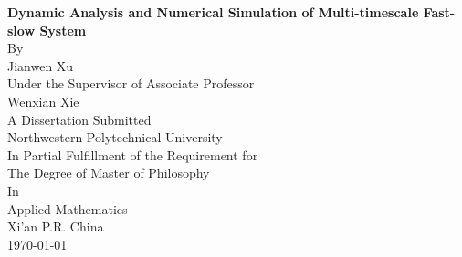 \begin{center}
{\sanhao\bf
Dynamic Analysis and Numerical Simulation of Multi-timescale Fast-slow System}\\
\vspace{2.6cm}
 {\xiaosan By\\
 Jianwen Xu\\\vspace{0.8em}
 Under the Supervisor of Associate Professor\\
 Wenxian Xie\\}
\vspace{2.6cm}
{\xiaosan
     A Dissertation Submitted \\
     Northwestern Polytechnical University\\
     \vspace{1cm}
     In Partial Fulfillment of the Requirement for\\
     The Degree of  Master of Philosophy\\
    In\\
    Applied Mathematics\\
    \vspace{2.5cm}
     Xi'an P.R. China\\
    \edate\today
}
 \end{center}
\newpage
\thispagestyle{empty}
\vspace*{8mm} %